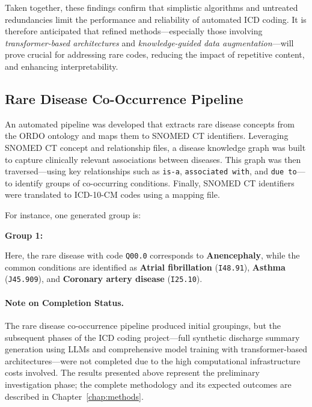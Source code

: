 Taken together, these findings confirm that simplistic algorithms and untreated redundancies limit the performance and reliability of automated ICD coding. It is therefore anticipated that refined methods---especially those involving \emph{transformer-based architectures} and \emph{knowledge-guided data augmentation}---will prove crucial for addressing rare codes, reducing the impact of repetitive content, and enhancing interpretability.

\subsection{Rare Disease Co-Occurrence Pipeline}\label{sec:p1:rare_disease_pipeline}

An automated pipeline was developed that extracts rare disease concepts from the ORDO ontology and maps them to SNOMED CT identifiers. Leveraging SNOMED CT concept and relationship files, a disease knowledge graph was built to capture clinically relevant associations between diseases. This graph was then traversed---using key relationships such as \texttt{is-a}, \texttt{associated with}, and \texttt{due to}---to identify groups of co-occurring conditions. Finally, SNOMED CT identifiers were translated to ICD-10-CM codes using a mapping file.

For instance, one generated group is:
\begin{center}
\textbf{Group 1:} \quad ['Q00.0', 'I48.91', 'J45.909', 'I25.10']
\end{center}
Here, the rare disease with code \texttt{Q00.0} corresponds to \textbf{Anencephaly}, while the common conditions are identified as \textbf{Atrial fibrillation} (\texttt{I48.91}), \textbf{Asthma} (\texttt{J45.909}), and \textbf{Coronary artery disease} (\texttt{I25.10}).

\paragraph{Note on Completion Status.}
The rare disease co-occurrence pipeline produced initial groupings, but the subsequent phases of the ICD coding project---full synthetic discharge summary generation using LLMs and comprehensive model training with transformer-based architectures---were not completed due to the high computational infrastructure costs involved. The results presented above represent the preliminary investigation phase; the complete methodology and its expected outcomes are described in Chapter~\ref{chap:methods}.


